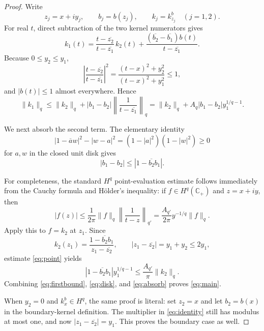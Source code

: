 \documentclass[11pt]{article}
\newcommand{\Cplus}{\mathbb C_+}
\begin{document}
\begin{proof}
Write
\[
 z_j=x+iy_j,\qquad b_j=b(z_j),\qquad k_j=k_{z_j}^b
 \quad(j=1,2).
\]
For real $t$, direct subtraction of the two kernel numerators gives
\begin{equation}\label{eq:identity}
 k_1(t)
 =\frac{t-\overline{z_2}}{t-\overline{z_1}}\,k_2(t)
  +\frac{(\overline{b_2}-\overline{b_1})b(t)}
         {t-\overline{z_1}}.
\end{equation}
Because $0\le y_2\le y_1$,
\[
 \left|\frac{t-\overline{z_2}}{t-\overline{z_1}}\right|^2
 =\frac{(t-x)^2+y_2^2}{(t-x)^2+y_1^2}\le1,
\]
and $|b(t)|\le1$ almost everywhere.  Hence
\begin{equation}\label{eq:firstbound}
 \lVert k_1\rVert_q
 \le \lVert k_2\rVert_q
 +|b_1-b_2|\left\lVert\frac1{t-\overline{z_1}}\right\rVert_q
 =\lVert k_2\rVert_q+A_q|b_1-b_2|y_1^{1/q-1}.
\end{equation}

We next absorb the second term.  The elementary identity
\[
 |1-\overline a w|^2-|w-a|^2
 =(1-|a|^2)(1-|w|^2)\ge0
 \]
for $a,w$ in the closed unit disk gives
\begin{equation}\label{eq:disk}
 |b_1-b_2|\le |1-\overline{b_2}b_1|.
\end{equation}

For completeness, the standard $H^q$ point-evaluation estimate follows
immediately from the Cauchy formula and H\"older's inequality: if
$f\in H^q(\Cplus)$ and $z=x+iy$, then
\begin{equation}\label{eq:point}
 |f(z)|
 \le \frac1{2\pi}\lVert f\rVert_q
       \left\lVert\frac1{t-z}\right\rVert_{q'}
 =\frac{A_{q'}}{2\pi}y^{-1/q}\lVert f\rVert_q.
\end{equation}
Apply this to $f=k_2$ at $z_1$.  Since
\[
 k_2(z_1)=\frac{1-\overline{b_2}b_1}{z_1-\overline{z_2}},
 \qquad |z_1-\overline{z_2}|=y_1+y_2\le2y_1,
\]
estimate \eqref{eq:point} yields
\begin{equation}\label{eq:absorb}
 |1-\overline{b_2}b_1|y_1^{1/q-1}
 \le \frac{A_{q'}}{\pi}\lVert k_2\rVert_q.
\end{equation}
Combining \eqref{eq:firstbound}, \eqref{eq:disk}, and
\eqref{eq:absorb} proves \eqref{eq:main}.

When $y_2=0$ and $k_x^b\in H^q$, the same proof is literal: set
$z_2=x$ and let $b_2=b(x)$ in the boundary-kernel definition.  The multiplier
in \eqref{eq:identity} still has modulus at most one, and now
$|z_1-\overline{z_2}|=y_1$.  This proves the boundary case as well.
\end{proof}
\end{document}
